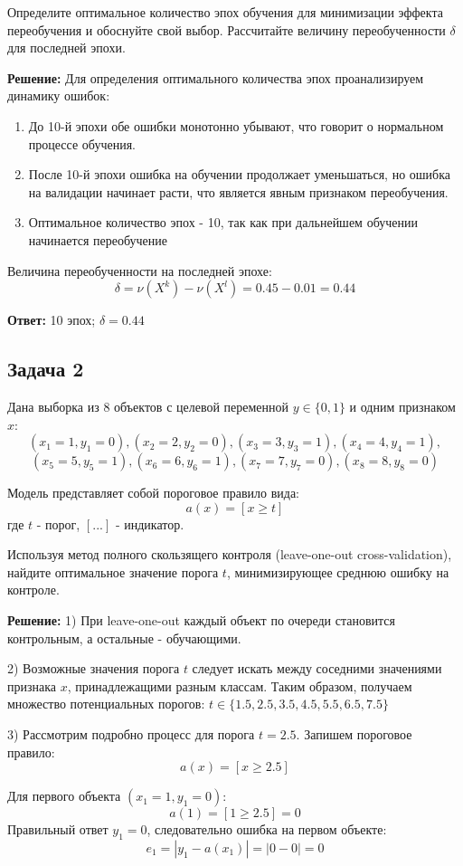 Определите оптимальное количество эпох обучения для минимизации эффекта переобучения и обоснуйте свой выбор. Рассчитайте величину переобученности $\delta$ для последней эпохи.

\textbf{Решение:}
Для определения оптимального количества эпох проанализируем динамику ошибок:
\begin{enumerate}
    \item До 10-й эпохи обе ошибки монотонно убывают, что говорит о нормальном процессе обучения.
    \item После 10-й эпохи ошибка на обучении продолжает уменьшаться, но ошибка на валидации начинает расти, что является явным признаком переобучения.
    \item Оптимальное количество эпох - 10, так как при дальнейшем обучении начинается переобучение
\end{enumerate}

Величина переобученности на последней эпохе:
$$\delta = \nu(X^k) - \nu(X^l) = 0.45 - 0.01 = 0.44$$

\textbf{Ответ:} 10 эпох; $\delta = 0.44$

\subsection*{Задача 2}
Дана выборка из 8 объектов с целевой переменной $y \in \{0,1\}$ и одним признаком $x$:
$$(x_1=1, y_1=0), (x_2=2, y_2=0), (x_3=3, y_3=1), (x_4=4, y_4=1),$$
$$(x_5=5, y_5=1), (x_6=6, y_6=1), (x_7=7, y_7=0), (x_8=8, y_8=0)$$

Модель представляет собой пороговое правило вида:
$$a(x) = [x \geq t]$$
где $t$ - порог, $[...]$ - индикатор.

Используя метод полного скользящего контроля (leave-one-out cross-validation), найдите оптимальное значение порога $t$, минимизирующее среднюю ошибку на контроле.

\textbf{Решение:}
1) При leave-one-out каждый объект по очереди становится контрольным, а остальные - обучающими.

2) Возможные значения порога $t$ следует искать между соседними значениями признака $x$, принадлежащими разным классам. Таким образом, получаем множество потенциальных порогов:
$t \in \{1.5, 2.5, 3.5, 4.5, 5.5, 6.5, 7.5\}$

3) Рассмотрим подробно процесс для порога $t = 2.5$. Запишем пороговое правило:
$$a(x) = [x \geq 2.5]$$

Для первого объекта $(x_1 = 1, y_1 = 0)$:
$$a(1) = [1 \geq 2.5] = 0$$
Правильный ответ $y_1 = 0$, следовательно ошибка на первом объекте:
$$e_1 = |y_1 - a(x_1)| = |0 - 0| = 0$$

